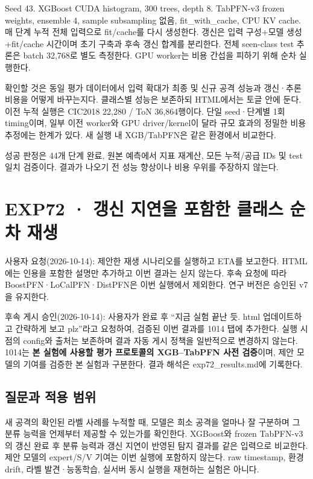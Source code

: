 Seed 43. XGBoost CUDA histogram, 300 trees, depth 8. TabPFN-v3 frozen weights, ensemble 4, sample subsampling 없음, fit\_\allowbreak{}with\_\allowbreak{}cache, CPU KV cache. 매 단계 누적 전체 입력으로 fit/\allowbreak{}cache를 다시 생성한다. 갱신은 입력 구성+\allowbreak{}모델 생성+\allowbreak{}fit/\allowbreak{}cache 시간이며 초기 구축과 후속 갱신 합계를 분리한다. 전체 seen-class test 추론은 batch 32,768로 별도 측정한다. GPU worker는 비용 간섭을 피하기 위해 순차 실행한다.

확인할 것은 동일 평가 데이터에서 입력 확대가 최종 및 신규 공격 성능과 갱신·추론 비용을 어떻게 바꾸는지다. 클래스별 성능은 보존하되 HTML에서는 토글 안에 둔다. 이전 누적 실행은 CIC2018 22,280 /\allowbreak{} ToN 36,864행이다. 단일 seed·단계별 1회 timing이며, 일부 이전 worker와 GPU driver/\allowbreak{}kernel이 달라 규모 효과의 정밀한 비용 추정에는 한계가 있다. 새 실행 내 XGB/\allowbreak{}TabPFN은 같은 환경에서 비교한다.

성공 판정은 44개 단계 완료, 원본 예측에서 지표 재계산, 모든 누적/\allowbreak{}공급 IDs 및 test 일치 검증이다. 결과가 나오기 전 성능 향상이나 비용 우위를 주장하지 않는다.



\section{EXP72 · 갱신 지연을 포함한 클래스 순차 재생}
사용자 요청(2026-10-14): 제안한 재생 시나리오를 실행하고 ETA를 보고한다. HTML에는 인용을 포함한 설명만 추가하고 이번 결과는 싣지 않는다. 후속 요청에 따라 BoostPFN·LoCalPFN·DistPFN은 이번 실행에서 제외한다. 연구 버전은 승인된 v7을 유지한다.

후속 게시 승인(2026-10-14): 사용자가 완료 후 “지금 실험 끝난 듯. html 업데이트하고 간략하게 보고 plz”라고 요청하여, 검증된 이번 결과를 1014 탭에 추가한다. 실행 시점의 config와 출처는 보존하며 결과 자동 게시 정책을 일반적으로 변경하지 않는다. 1014는 \textbf{본 실험에 사용할 평가 프로토콜의 XGB–TabPFN 사전 검증}이며, 제안 모델의 기여를 검증한 본 실험과 구분한다. 결과 해석은 exp72\_\allowbreak{}results.md에 기록한다.

\subsection{질문과 적용 범위}
새 공격의 확인된 라벨 사례를 누적할 때, 모델은 희소 공격을 얼마나 잘 구분하며 그 분류 능력을 언제부터 제공할 수 있는가를 확인한다. XGBoost와 frozen TabPFN-v3의 갱신 완료 후 분류 능력과 갱신 지연이 반영된 탐지 결과를 같은 입력으로 비교한다. 제안 모델의 expert/\allowbreak{}S/\allowbreak{}V 기여는 이번 실행에 포함하지 않는다. raw timestamp, 환경 drift, 라벨 발견·능동학습, 실서버 동시 실행을 재현하는 실험은 아니다.

